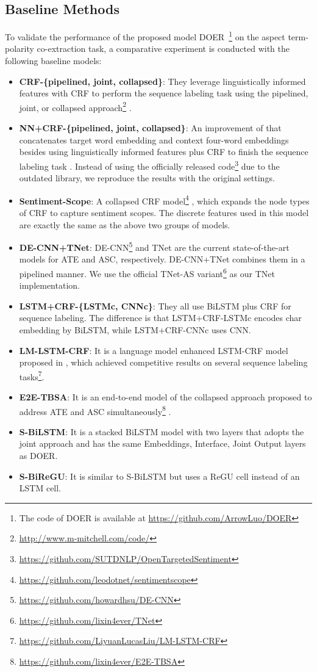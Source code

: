 \documentclass[11pt,a4paper]{article}
\begin{document}
	\subsection{Baseline Methods}
	To validate the performance of the proposed model DOER~\footnote{The code of DOER is available at \url{https://github.com/ArrowLuo/DOER}} on the aspect term-polarity co-extraction task, a comparative experiment is conducted with the following baseline models:
	\begin{itemize}
		\item \textbf{CRF-\{pipelined, joint, collapsed\}}: They leverage linguistically informed features with CRF to perform the sequence labeling task using the pipelined, joint, or collapsed approach\footnote{\url{http://www.m-mitchell.com/code/}} \cite{Mitchell2013}.
		\item \textbf{NN+CRF-\{pipelined, joint, collapsed\}}: An improvement of \cite{Mitchell2013} that concatenates target word embedding and context four-word embeddings besides using linguistically informed features plus CRF to finish the sequence labeling task \cite{Zhang2015}. Instead of using the officially released code\footnote{\url{https://github.com/SUTDNLP/OpenTargetedSentiment}} due to the outdated library, we reproduce the results with the original settings.
		\item \textbf{Sentiment-Scope}: A collapsed CRF model\footnote{\url{https://github.com/leodotnet/sentimentscope}} \cite{Li2017}, which expands the node types of CRF to capture sentiment scopes. The discrete features used in this model are exactly the same as the above two groups of models.
		\item \textbf{DE-CNN+TNet}: DE-CNN\footnote{\url{https://github.com/howardhsu/DE-CNN}} \cite{Xu2018} and TNet \cite{Li2018b} are the current state-of-the-art models for ATE and ASC, respectively. DE-CNN+TNet combines them in a pipelined manner. We use the official TNet-AS variant\footnote{\url{https://github.com/lixin4ever/TNet}} as our TNet implementation.
		\item \textbf{LSTM+CRF-\{LSTMc, CNNc\}}: They all use BiLSTM plus CRF for sequence labeling. The difference is that LSTM+CRF-LSTMc \cite{Lample2016} encodes char embedding by BiLSTM, while LSTM+CRF-CNNc \cite{Ma2016} uses CNN.
		\item \textbf{LM-LSTM-CRF}: It is a language model enhanced LSTM-CRF model proposed in \cite{Liu2018}, which achieved competitive results on several sequence labeling tasks\footnote{\url{https://github.com/LiyuanLucasLiu/LM-LSTM-CRF}}.
		\item \textbf{E2E-TBSA}: It is an end-to-end model of the collapsed approach proposed to address ATE and ASC simultaneously\footnote{\url{https://github.com/lixin4ever/E2E-TBSA}} \cite{Li2019}.
		\item \textbf{S-BiLSTM}: It is a stacked BiLSTM model with two layers that adopts the joint approach and has the same Embeddings, Interface, Joint Output layers as DOER.
		\item \textbf{S-BiReGU}: It is similar to S-BiLSTM but uses a ReGU cell instead of an LSTM cell.
	\end{itemize}
\end{document}
